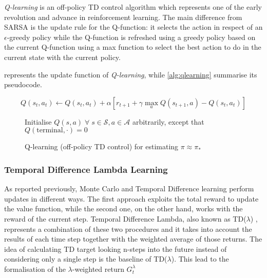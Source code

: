 \textit{Q-learning} \cite{watkins1989learning} is an off-policy TD control algorithm which represents one of the early revolution and advance in reinforcement learning.
The main difference from SARSA is the update rule for the Q-function: it selects the action in respect of an $\epsilon$-greedy policy while the Q-function is refreshed using a greedy policy based on the current Q-function using a max function to select the best action to do in the current state with the current policy.

 represents the update function of \textit{Q-learning}, while \vref{alg:qlearning} summarise its pseudocode.

\begin{equation}\label{eq:qlearning}
Q(s_t, a_t) \leftarrow Q(s_t, a_t) + \alpha [r_{t+1} + \gamma \max_{a}{Q(s_{t+1}, a)} - Q(s_t, a_t)]
\end{equation}

\begin{figure}
	
	\begin{algorithm}[H]
		\SetAlgoLined
		\DontPrintSemicolon
		\LinesNumbered
		\KwIn{step size $\alpha \in (0,1]$, small $\epsilon > 0$\;}
		Initialise $Q(s,a) \; \forall\; s \in \mathcal{S}, a \in \mathcal{A}$ arbitrarily, except that $Q(\text{terminal}, \cdot) = 0$\;
		\caption{Q-learning (off-policy TD control) for estimating $\pi \approx \pi_*$}
		\label{alg:qlearning}
	\end{algorithm}
\end{figure}

\subsubsection{Temporal Difference Lambda Learning}

As reported previously, Monte Carlo and Temporal Difference learning perform updates in different ways. The first approach exploits the total reward to update the value function, while the second one, on the other hand, works with the reward of the current step. Temporal Difference Lambda, also known as TD($\lambda$) \cite[Chapter 7,12]{sutton2018reinforcement}, represents a combination of these two procedures and it takes into account the results of each time step together with the weighted average of those returns.
The idea of calculating TD target looking n-steps into the future instead of considering only a single step is the baseline of TD($\lambda$). This lead to the formalisation of the $\lambda$-weighted return $G_t^\lambda$

